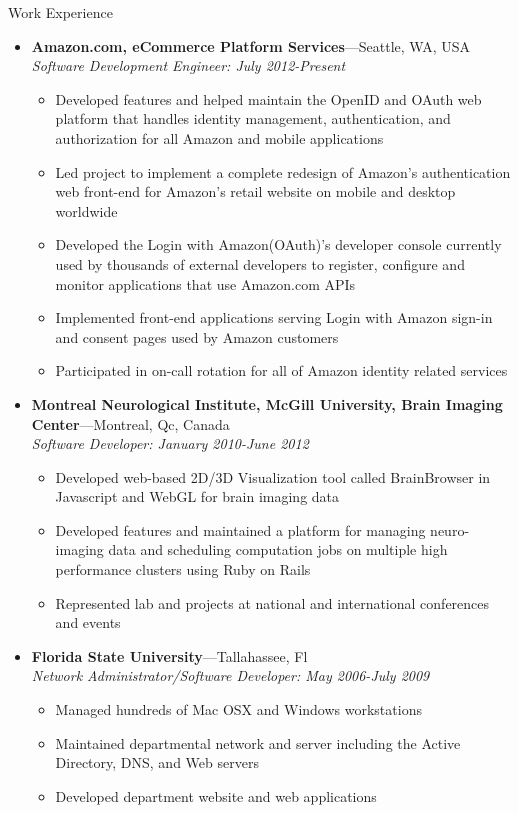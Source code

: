 \documentclass[10pt,oneside]{article}
\newenvironment{ressection}[1]{
  \vspace{4pt}
	 {\fontfamily{phv}\selectfont\Large#1}
	 \begin{itemize}
	   \vspace{3pt}
}{
	 \end{itemize}
}
\newcommand{\ressubitem}[1]{
  \vspace{-1pt}
\item \begin{flushleft} #1 \end{flushleft}
}
\newcommand{\resbigitem}[3]{
  \vspace{-5pt}
\item
  \textbf{#1}---#2 \\
  \textit{#3}
}
\newenvironment{ressubsec}[3]{
  \resbigitem{#1}{#2}{#3}
  \vspace{-2pt}
  \begin{itemize}
}{
  \end{itemize}
}
\begin{document}
\begin{ressection}{Work Experience}
  \begin{ressubsec}{Amazon.com, eCommerce Platform Services}{Seattle, WA, USA}{Software Development Engineer: July 2012-Present}  
    \ressubitem {Developed features and helped  maintain the OpenID and OAuth web platform that handles identity management, authentication, and authorization for all Amazon and mobile applications}
    \ressubitem {Led project to implement a complete redesign of Amazon's authentication web front-end for Amazon's retail website on mobile and desktop worldwide}
    \ressubitem {Developed the Login with Amazon(OAuth)'s developer console currently used by thousands of external developers to register, configure and monitor applications that use Amazon.com APIs}
    \ressubitem {Implemented front-end applications serving Login with Amazon sign-in and consent pages used by Amazon customers}
    \ressubitem {Participated in on-call rotation for all of Amazon identity related services}
  \end{ressubsec}
  \begin{ressubsec}{Montreal Neurological Institute, McGill University, Brain Imaging Center}{Montreal, Qc, Canada}{Software Developer: January 2010-June 2012}
    \ressubitem {Developed web-based 2D/3D Visualization tool called BrainBrowser in Javascript and WebGL for brain imaging data}
    \ressubitem {Developed features and maintained a platform for managing neuro-imaging data and scheduling computation jobs on multiple high performance clusters using Ruby on Rails}
    \ressubitem {Represented lab and projects at national and international conferences and events}
  \end{ressubsec}
  \begin{ressubsec}{Florida State University}{Tallahassee, Fl}{Network Administrator/Software Developer: May 2006-July 2009}
    \ressubitem{Managed hundreds of Mac OSX and Windows workstations}
    \ressubitem{Maintained departmental network and server including the Active Directory, DNS, and Web servers}
    \ressubitem{Developed department website and web applications}
  \end{ressubsec}
\end{ressection}
\end{document}
